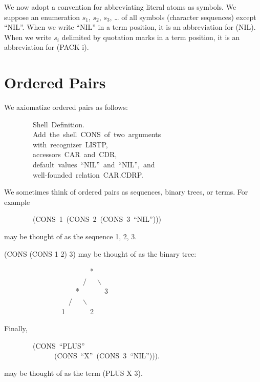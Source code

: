 \documentclass[11pt]{book}
\newenvironment{pubasis}{\begin{flushleft}\ttfamily\small}{\normalsize\rmfamily\end{flushleft}}
\newcommand{\pubdefaulttextsize}{\large}
\begin{document}
We now adopt a convention for abbreviating literal atoms as symbols.
We suppose an enumeration $s_{1}$, $s_{2}$, $s_{3}$, \ldots{}
of all symbols (character sequences) except ``NIL''.  When we write
``NIL'' in a term position, it is an abbreviation for (NIL).  When
we write $s_{i}$ delimited by quotation marks in a term position,
it is an abbreviation for (PACK i).
\section{Ordered Pairs}
\pubdefaulttextsize
We axiomatize ordered pairs as follows:
\par\pagebreak[0]\hrulefill\nopagebreak\par
\begin{pubasis}
~~~~~~~~Shell~Definition.\\
~~~~~~~~Add~the~shell~CONS~of~two~arguments\\
~~~~~~~~with~recognizer~LISTP,\\
~~~~~~~~accessors~CAR~and~CDR,\\
~~~~~~~~default~values~``NIL''~and~``NIL'',~and\\
~~~~~~~~well-founded~relation~CAR.CDRP.\\
\end{pubasis}
\nopagebreak\par\hrulefill\nopagebreak\par
We sometimes think of ordered pairs as sequences, binary trees, or terms.
For example
\begin{pubasis}
~~~~~~~~(CONS~1~(CONS~2~(CONS~3~``NIL'')))\\
\end{pubasis}
may be thought of as the sequence 1, 2, 3.

(CONS (CONS 1 2) 3) may be thought of as the binary tree:
\begin{pubasis}
~~~~~~~~~~~~~~~~~~~~~~~~*\\
~~~~~~~~~~~~~~~~~~~~~~$/$~~~$\backslash$\\
~~~~~~~~~~~~~~~~~~~~*~~~~~~~3\\
~~~~~~~~~~~~~~~~~~$/$~~~$\backslash$\\
~~~~~~~~~~~~~~~~1~~~~~~~2\\
\end{pubasis}
Finally,
\begin{pubasis}
~~~~~~~~(CONS~``PLUS''\\
~~~~~~~~~~~~~~(CONS~``X''~(CONS~3~``NIL''))).\\
\end{pubasis}
may be thought of as the term (PLUS X 3).
\end{document}
